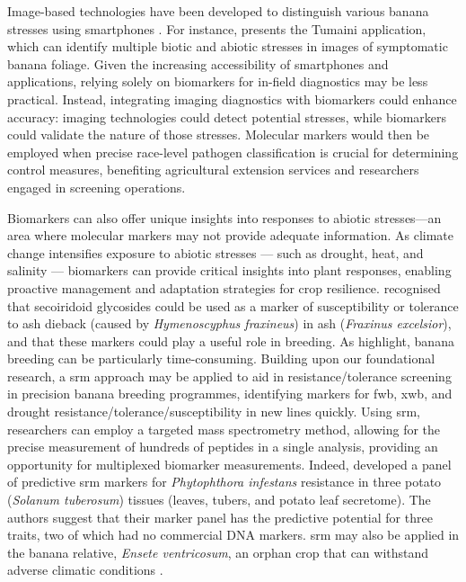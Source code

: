 Image-based technologies have been developed to distinguish various banana stresses using smartphones \parencite{Aasha2024}. For instance, \textcite{Selvaraj2019b} presents the Tumaini application, which can identify multiple biotic and abiotic stresses in images of symptomatic banana foliage. Given the increasing accessibility of smartphones and applications, relying solely on biomarkers for in-field diagnostics may be less practical. Instead, integrating imaging diagnostics with biomarkers could enhance accuracy: imaging technologies could detect potential stresses, while biomarkers could validate the nature of those stresses. Molecular markers would then be employed when precise race-level pathogen classification is crucial for determining control measures, benefiting agricultural extension services and researchers engaged in screening operations.

Biomarkers can also offer unique insights into responses to abiotic stresses—an area where molecular markers may not provide adequate information. As climate change intensifies exposure to abiotic stresses — such as drought, heat, and salinity — biomarkers can provide critical insights into plant responses, enabling proactive management and adaptation strategies for crop resilience. \textcite{Sambles2017, Sidda2020} recognised that secoiridoid glycosides could be used as a marker of susceptibility or tolerance to ash dieback (caused by \textit{Hymenoscyphus fraxineus}) in ash (\textit{Fraxinus excelsior}), and that these markers could play a useful role in breeding. As \textcite{Nansamba2020, Kumar2020} highlight, banana breeding can be particularly time-consuming. Building upon our foundational research, a \ac{srm} approach may be applied to aid in resistance/tolerance screening in precision banana breeding programmes, identifying markers for \ac{fwb}, \ac{xwb}, and drought resistance/tolerance/susceptibility in new lines quickly. Using \ac{srm}, researchers can employ a targeted mass spectrometry method, allowing for the precise measurement of hundreds of peptides in a single analysis, providing an opportunity for multiplexed biomarker measurements. Indeed, \textcite{Chawade2016} developed a panel of predictive \ac{srm} markers for \textit{Phytophthora infestans} resistance in three potato (\textit{Solanum tuberosum}) tissues (leaves, tubers, and potato leaf secretome). The authors suggest that their marker panel has the predictive potential for three traits, two of which had no commercial DNA markers. \Ac{srm} may also be applied in the banana relative, \textit{Ensete ventricosum}, an orphan crop that can withstand adverse climatic conditions \parencite{Feyisa2022}.


